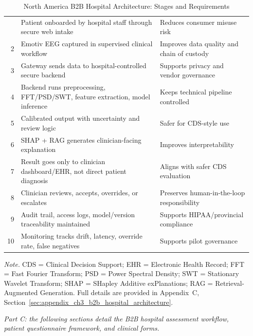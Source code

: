 {\tablestripes\tablefontsize
{}
\begin{xltabular}{\textwidth}{@{} r L L @{}}
\caption[North America B2B Hospital Architecture]{North America B2B Hospital Architecture: Stages and Requirements}\label{tab:b2b_hospital_architecture} \\
\toprule
\thead{\#} &  &  \\
\midrule
\endfirsthead
\endhead
\bottomrule
{} & Patient onboarded by hospital staff through secure web intake & Reduces consumer misuse risk \\
2 & Emotiv EEG captured in supervised clinical workflow & Improves data quality and chain of custody \\
3 & Gateway sends data to hospital-controlled secure backend & Supports privacy and vendor governance \\
4 & Backend runs preprocessing, FFT/PSD/SWT, feature extraction, model inference & Keeps technical pipeline controlled \\
5 & Calibrated output with uncertainty and review logic & Safer for CDS-style use \\
6 & SHAP + RAG generates clinician-facing explanation & Improves interpretability \\
7 & Result goes only to clinician dashboard/EHR, not direct patient diagnosis & Aligns with safer CDS evaluation \\
8 & Clinician reviews, accepts, overrides, or escalates & Preserves human-in-the-loop responsibility \\
9 & Audit trail, access logs, model/version traceability maintained & Supports HIPAA/provincial compliance \\
10 & Monitoring tracks drift, latency, override rate, false negatives & Supports pilot governance \\
\end{xltabular}}
\vspace{2pt}
\noindent\textit{Note.} CDS = Clinical Decision Support; EHR = Electronic Health Record; FFT = Fast Fourier Transform; PSD = Power Spectral Density; SWT = Stationary Wavelet Transform; SHAP = SHapley Additive exPlanations; RAG = Retrieval-Augmented Generation.
\fi
\noindent Full details are provided in Appendix~C, Section~\ref{sec:appendix_ch3_b2b_hospital_architecture}.




\noindent\textit{\color{currentaccent}Part C: the following sections detail the B2B hospital assessment workflow, patient questionnaire framework, and clinical forms.}


